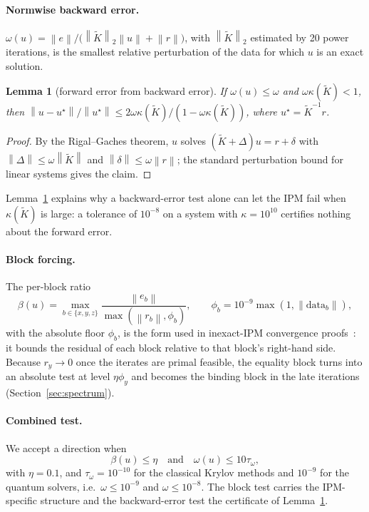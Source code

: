\documentclass[11pt]{article}
\newtheorem{lemma}[theorem]{Lemma}
\theoremstyle{definition}
\newcommand{\norm}[1]{\left\lVert #1 \right\rVert}
\newcommand{\Kt}{\tilde K}
\begin{document}
\paragraph{Normwise backward error.} $\omega(u)=\norm{e}\big/\big(\norm{\Kt}_2\norm{u}+\norm{r}\big)$, with $\norm{\Kt}_2$ estimated by 20 power iterations, is the smallest relative perturbation of the data for which $u$ is an exact solution.
\begin{lemma}[forward error from backward error]\label{lem:fwd}
If $\omega(u)\le\omega$ and $\omega\kappa(\Kt)<1$, then $\norm{u-u^\star}/\norm{u^\star}\le 2\omega\kappa(\Kt)/(1-\omega\kappa(\Kt))$, where $u^\star=\Kt^{-1}r$.
\end{lemma}
\begin{proof}
By the Rigal--Gaches theorem, $u$ solves $(\Kt+\Delta)u=r+\delta$ with $\norm{\Delta}\le\omega\norm{\Kt}$ and $\norm{\delta}\le\omega\norm{r}$; the standard perturbation bound for linear systems gives the claim.
\end{proof}
Lemma~\ref{lem:fwd} explains why a backward-error test alone can let the IPM fail when $\kappa(\Kt)$ is large: a tolerance of $10^{-8}$ on a system with $\kappa=10^{10}$ certifies nothing about the forward error.

\paragraph{Block forcing.} The per-block ratio
\[
\beta(u)=\max_{b\in\{x,y,z\}}\frac{\norm{e_b}}{\max(\norm{r_b},\phi_b)},\qquad \phi_b=10^{-9}\max(1,\norm{\text{data}_b}),
\]
with the absolute floor $\phi_b$, is the form used in inexact-IPM convergence proofs~\cite{bellavia1998inexact,gondzio2013convergence}: it bounds the residual of each block relative to that block's right-hand side. Because $r_y\to0$ once the iterates are primal feasible, the equality block turns into an absolute test at level $\eta\phi_y$ and becomes the binding block in the late iterations (Section~\ref{sec:spectrum}).

\paragraph{Combined test.} We accept a direction when
\begin{equation}\label{eq:comb}
\beta(u)\le\eta\quad\text{and}\quad\omega(u)\le10\tau_\omega,
\end{equation}
with $\eta=0.1$, and $\tau_\omega=10^{-10}$ for the classical Krylov methods and $10^{-9}$ for the quantum solvers, i.e.\ $\omega\le10^{-9}$ and $\omega\le10^{-8}$. The block test carries the IPM-specific structure and the backward-error test the certificate of Lemma~\ref{lem:fwd}.
\end{document}
